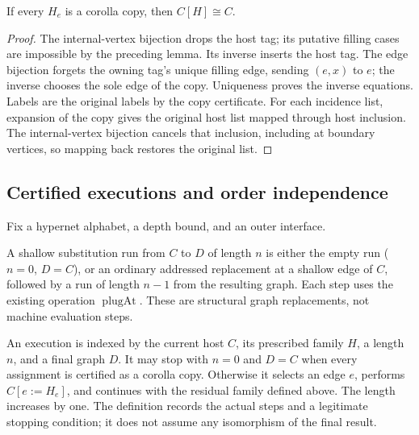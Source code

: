 \begin{lemma}
If every $H_e$ is a corolla copy, then $C[H]\cong C$.
\end{lemma}
\begin{proof}
The internal-vertex bijection drops the host tag; its putative filling
cases are impossible by the preceding lemma. Its inverse inserts the host
tag. The edge bijection forgets the owning tag's unique filling edge,
sending $(e,x)$ to $e$; the inverse chooses the sole edge of the copy.
Uniqueness proves the inverse equations. Labels are the original labels
by the copy certificate. For each incidence list, expansion of the copy
gives the original host list mapped through host inclusion. The
internal-vertex bijection cancels that inclusion, including at boundary
vertices, so mapping back restores the original list.
\end{proof}

\subsection{Certified executions and order independence}
Fix a hypernet alphabet, a depth bound, and an outer interface.
\begin{definition}\label{term:shallow-run}
A shallow substitution run from $C$ to $D$ of length $n$ is either the
empty run ($n=0$, $D=C$), or an ordinary addressed replacement at a shallow
edge of $C$, followed by a run of length $n-1$ from the resulting graph.
Each step uses the existing operation $\operatorname{plugAt}$.
These are structural graph replacements, not machine evaluation steps.
\end{definition}

\begin{definition}\label{term:filling-execution}
An execution is indexed by the current host $C$, its prescribed family
$H$, a length $n$, and a final graph $D$. It may stop with $n=0$ and $D=C$
when every assignment is certified as a corolla copy. Otherwise it selects
an edge $e$, performs $C[e:=H_e]$, and continues with the residual family
defined above. The length increases by one.
The definition records the actual steps and a legitimate stopping
condition; it does not assume any isomorphism of the final result.
\end{definition}

